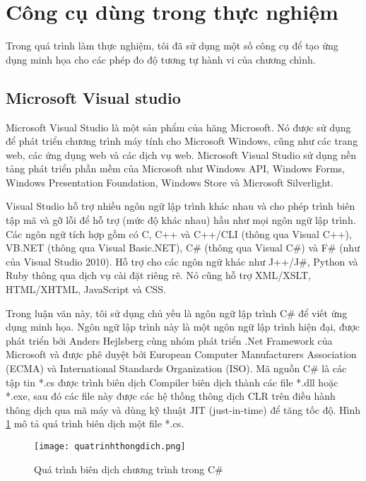 \section{Công cụ dùng trong thực nghiệm}

Trong quá trình làm thực nghiệm, tôi đã sử dụng một số công cụ để tạo ứng dụng minh họa cho các phép đo độ tương tự hành vi của chương chình.

\subsection{Microsoft Visual studio}
Microsoft Visual Studio là một sản phẩm của hãng Microsoft. Nó được sử dụng để phát triển chương trình máy tính cho Microsoft Windows, cũng như các trang web, các ứng dụng web và các dịch vụ web. Microsoft Visual Studio sử dụng nền tảng phát triển phần mềm của Microsoft như Windows API, Windows Forms, Windows Presentation Foundation, Windows Store và Microsoft Silverlight. 

Visual Studio hỗ trợ nhiều ngôn ngữ lập trình khác nhau và cho phép trình biên tập mã và gỡ lỗi để hỗ trợ (mức độ khác nhau) hầu như mọi ngôn ngữ lập trình. Các ngôn ngữ tích hợp gồm có C, C++ và C++/CLI (thông qua Visual C++), VB.NET (thông qua Visual Basic.NET), C\#  (thông qua Visual C\#) và F\# (như của Visual Studio 2010). Hỗ trợ cho các ngôn ngữ khác như J++/J\#, Python và Ruby thông qua dịch vụ cài đặt riêng rẽ. Nó cũng hỗ trợ XML/XSLT, HTML/XHTML, JavaScript và CSS.

Trong luận văn này, tôi sử dụng chủ yếu là ngôn ngữ lập trình C\# để viết ứng dụng minh họa. Ngôn ngữ lập trình này là một ngôn ngữ lập trình hiện đại, được phát triển bởi Anders Hejlsberg cùng nhóm phát triển .Net Framework của Microsoft và được phê duyệt bởi European Computer Manufacturers Association (ECMA) và International Standards Organization (ISO). Mã nguồn C\# là các tập tin *.cs được trình biên dịch Compiler biên dịch thành các file *.dll hoặc *.exe, sau đó các file này được các hệ thống thông dịch CLR trên điều hành thông dịch qua mã máy và dùng kỹ thuật JIT (just-in-time) để tăng tốc độ. Hình \ref{fig:ProcessCompile} mô tả quá trình biên dịch một file *.cs.


\begin{figure}[H]	
	\begin{center}
	  \texttt{[image: quatrinhthongdich.png]}
	\end{center}
	\caption{Quá trình biên dịch chương trình trong C\#}
	\label{fig:ProcessCompile}
\end{figure}



